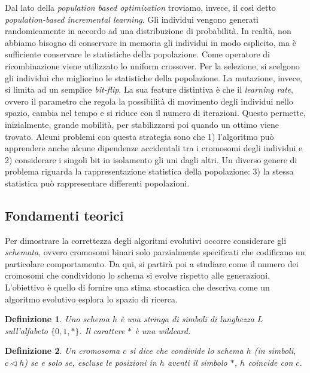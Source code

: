\documentclass[10pt,a4paper]{article}
\newtheorem{definition}{Definizione}
\begin{document}
Dal lato della \emph{population based optimization} troviamo, invece, il così detto \emph{population-based incremental learning}. Gli individui vengono generati randomicamente in accordo ad una distribuzione di probabilità. In realtà, non abbiamo bisogno di conservare in memoria gli individui in modo esplicito, ma è sufficiente conservare le statistiche della popolazione. Come operatore di ricombinazione viene utilizzato lo uniform crossover. Per la selezione, si scelgono gli individui che migliorino le statistiche della popolazione. La mutazione, invece, si limita ad un semplice \emph{bit-flip}. La sua feature distintiva è che il \emph{learning rate}, ovvero il parametro che regola la possibilità di movimento degli individui nello spazio, cambia nel tempo e si riduce con il numero di iterazioni. Questo permette, inizialmente, grande mobilità, per stabilizzarsi poi quando un ottimo viene trovato. Alcuni problemi con questa strategia sono che 1) l'algoritmo può apprendere anche alcune dipendenze accidentali tra i cromosomi degli individui e 2) considerare i singoli bit in isolamento gli uni dagli altri. Un diverso genere di problema riguarda la rappresentazione statistica della popolazione: 3) la stessa statistica può rappresentare differenti popolazioni.

\subsection{Fondamenti teorici}

Per dimostrare la correttezza degli algoritmi evolutivi occorre considerare gli \emph{schemata}, ovvero cromosomi binari solo parzialmente specificati che codificano un particolare comportamento. Da qui, si partirà poi a studiare come il numero dei cromosomi che condividono lo schema si evolve rispetto alle generazioni. L'obiettivo è quello di fornire una stima stocastica che descriva come un algoritmo evolutivo esplora lo spazio di ricerca.

\begin{definition}
Uno \emph{schema} $h$ è una stringa di simboli di lunghezza $L$ sull'alfabeto $\{0,1,*\}$. Il carattere $*$ è una wildcard.
\end{definition}

\begin{definition}
Un cromosoma $c$ si dice che \emph{condivide} lo schema $h$ (in simboli, $c \triangleleft h$) se e solo se, escluse le posizioni in $h$ aventi il simbolo $*$, $h$ coincide con $c$.
\end{definition}
\end{document}
